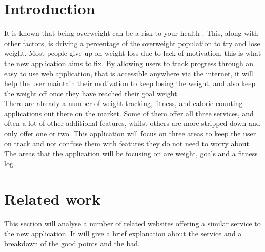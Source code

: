 \section{Introduction}
It is known that being overweight can be a risk to your health \citep{theordre:1985}. This, along with other factors, is driving a percentage of the overweight population to try and lose weight. Most people give up on weight loss due to lack of motivation, this is what the new application aims to fix. By allowing users to track progress through an easy to use web application, that is accessible anywhere via the internet, it will help the user maintain their motivation to keep losing the weight, and also keep the weight off once they have reached their goal weight.\\

There are already a number of weight tracking, fitness, and calorie counting applications out there on the market. Some of them offer all three services, and often a lot of other additional features, whilst others are more stripped down and only offer one or two. This application will focus on three areas to keep the user on track and not confuse them with features they do not need to worry about. The areas that the application will be focusing on are weight, goals and a fitness log.

\section{Related work}
This section will analyse a number of related websites offering a similar service to the new application. It will give a brief explanation about the service and a breakdown of the good points and the bad.

